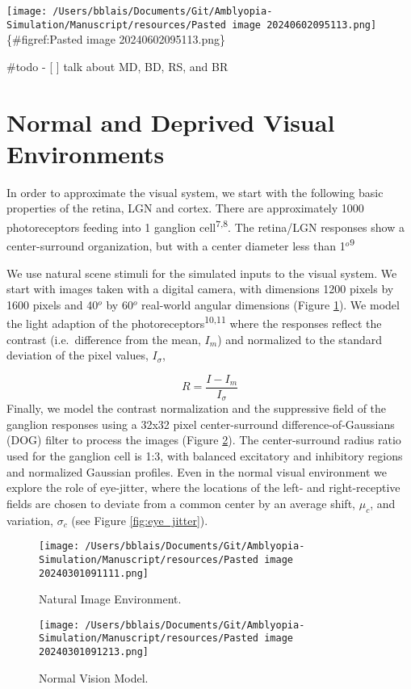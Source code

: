 \documentclass[
]{article}
\begin{document}
\texttt{[image: /Users/bblais/Documents/Git/Amblyopia-Simulation/Manuscript/resources/Pasted image 20240602095113.png]}\{\#figref:Pasted
image 20240602095113.png\}

\#todo - {[} {]} talk about MD, BD, RS, and BR

\section{Normal and Deprived Visual
Environments}\label{sec:normal-and-deprived-visual-environments}

In order to approximate the visual system, we start with the following
basic properties of the retina, LGN and cortex. There are approximately
1000 photoreceptors feeding into 1 ganglion cell\textsuperscript{7,8}.
The retina/LGN responses show a center-surround organization, but with a
center diameter less than 1\(^o\)\textsuperscript{9}

We use natural scene stimuli for the simulated inputs to the visual
system. We start with images taken with a digital camera, with
dimensions 1200 pixels by 1600 pixels and 40\(^o\) by 60\(^o\)
real-world angular dimensions (Figure \ref{fig:natural_images}). We
model the light adaption of the photoreceptors\textsuperscript{10,11}
where the responses reflect the contrast (i.e.~difference from the mean,
\(I_m\)) and normalized to the standard deviation of the pixel values,
\(I_\sigma\),

\[
R=\frac{I-I_m}{I_\sigma}
\] Finally, we model the contrast normalization and the suppressive
field of the ganglion responses using a 32x32 pixel center-surround
difference-of-Gaussians (DOG) filter to process the images (Figure
\ref{fig:normal_vision_model}). The center-surround radius ratio used
for the ganglion cell is 1:3, with balanced excitatory and inhibitory
regions and normalized Gaussian profiles. Even in the normal visual
environment we explore the role of eye-jitter, where the locations of
the left- and right-receptive fields are chosen to deviate from a common
center by an average shift, \(\mu_c\), and variation, \(\sigma_c\) (see
Figure \ref{fig:eye_jitter}).

\begin{figure}
\centering
\texttt{[image: /Users/bblais/Documents/Git/Amblyopia-Simulation/Manuscript/resources/Pasted image 20240301091111.png]}
\caption{Natural Image Environment.}\label{fig:natural_images}
\end{figure}

\begin{figure}
\centering
\texttt{[image: /Users/bblais/Documents/Git/Amblyopia-Simulation/Manuscript/resources/Pasted image 20240301091213.png]}
\caption{Normal Vision Model.}\label{fig:normal_vision_model}
\end{figure}
\end{document}

